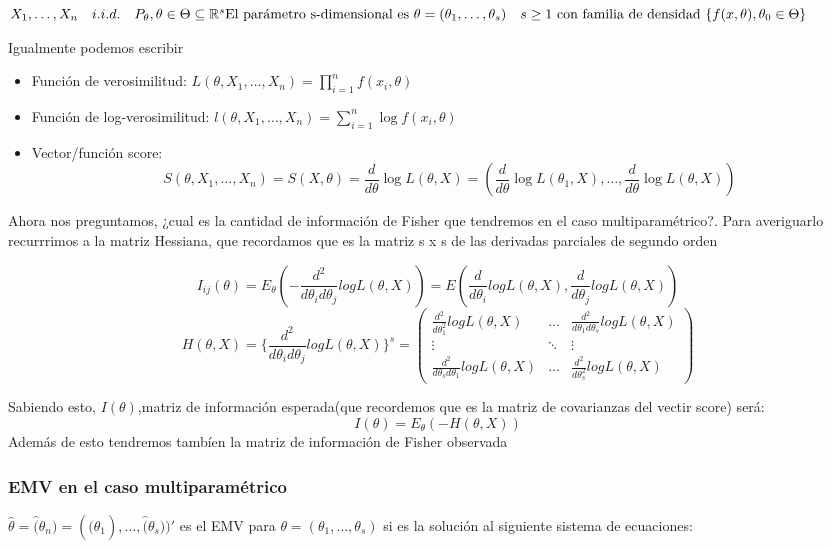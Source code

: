 \(
X_1,\dots,X_n \quad i.i.d. \quad P_\theta,\theta \in \Theta \subseteq \mathbb{R}^s  \text{El parámetro s-dimensional es } \theta = (\theta_1,\dots,\theta_s) \\ \quad s \geq 1
 \text{ con familia de densidad }\{ f(x,\theta),\theta_0 \in \Theta\}
\)

Igualmente podemos escribir

\begin{itemize}
    \item Función de verosimilitud: $L(\theta,X_1,\dots,X_n)=\prod^{n}_{i=1} f(x_i,\theta)$
    \item Función de log-verosimilitud: $l(\theta,X_1,\dots,X_n)=\sum^{n}_{i=1} \log f(x_i,\theta)$
    \item Vector/función score: $$S(\theta,X_1,\dots,X_n)=S(X,\theta)=\frac{d}{d \theta} \log L(\theta,X)
    = (\frac{d}{d \theta} \log L(\theta_1,X),\dots,\frac{d}{d \theta} \log L(\theta,X))$$
\end{itemize}

Ahora nos preguntamos, ¿cual es la cantidad de información de Fisher que tendremos en el caso multiparamétrico?.
Para averiguarlo recurrrimos a la matriz Hessiana, que recordamos que es la matriz s x s de las derivadas parciales de segundo orden

\[
I_{ij}(\theta)=E_\theta(-\frac{d^2}{d \theta_i d \theta_j} log L(\theta,X))
=E(\frac{d}{d \theta_i} log L(\theta,X),\frac{d}{d \theta_j} log L(\theta,X))
\]
\[
H(\theta,X)=\{ \frac{d^2}{d \theta_i d \theta_j}log L(\theta,X) \}^s 
=
\begin{pmatrix}
    \frac{d^2}{d \theta_1^2}log L(\theta,X) & \dots & \frac{d^2}{d \theta_1 d \theta_s}log L(\theta,X) \\
    \vdots & \ddots & \vdots \\
    \frac{d^2}{d \theta_s d \theta_1}log L(\theta,X) & \dots & \frac{d^2}{d \theta_s^2}log L(\theta,X)
\end{pmatrix}
\]

Sabiendo esto, $I(\theta)$,matriz de información esperada(que recordemos que es la matriz de covarianzas del vectir score) será:
\[
I(\theta) = E_\theta(-H(\theta,X))
\]
Además de esto tendremos tambíen la matriz de información de Fisher observada

\subsubsection{EMV en el caso multiparamétrico}

$\hat{\theta}=\hat(\theta_n)=(\hat(\theta_1),\dots,\hat(\theta_s))'$ es el EMV para $\theta=(\theta_1,\dots,\theta_s)$
si es la solución al siguiente sistema de ecuaciones:

